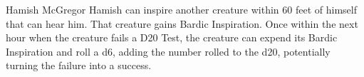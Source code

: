 \begin{DndMonster}[width=0.5\textwidth]{Hamish McGregor}
	Hamish can inspire another creature within 60 feet of himself that can hear him. That creature gains Bardic Inspiration. Once within the next hour when the creature fails a D20 Test, the creature can expend its Bardic Inspiration and roll a d6, adding the number rolled to the d20, potentially turning the failure into a success.
\end{DndMonster}